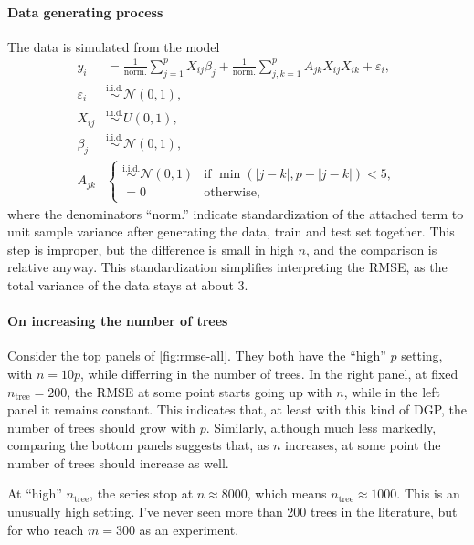 \documentclass{article}
\begin{document}
    \paragraph{Data generating process}

    The data is simulated from the model
    \begin{align}
        y_i &= \frac 1{\text{norm.}} \sum_{j=1}^p X_{ij} \beta_j + \frac 1{\text{norm.}} \sum_{j,k=1}^p A_{jk} X_{ij} X_{ik} + \varepsilon_i, \label{eq:rmsedgp} \\
        \varepsilon_i &\overset{\text{i.i.d.}}{\sim} \mathcal N(0, 1), \\
        X_{ij} &\overset{\text{i.i.d.}}{\sim} U(0, 1), \\
        \beta_j &\overset{\text{i.i.d.}}{\sim} \mathcal N(0, 1), \\
        A_{jk} &\begin{cases}
            \overset{\text{i.i.d.}}{\sim} \mathcal N(0, 1) & \text{if $\min(|j - k|, p - |j - k|) < 5$}, \\
            =0 & \text{otherwise},
        \end{cases}
    \end{align}
    where the denominators ``norm.'' indicate standardization of the attached term to unit sample variance after generating the data, train and test set together. This step is improper, but the difference is small in high $n$, and the comparison is relative anyway. This standardization simplifies interpreting the RMSE, as the total variance of the data stays at about 3.

    \paragraph{On increasing the number of trees}

    Consider the top panels of \autoref{fig:rmse-all}. They both have the ``high'' $p$ setting, with $n = 10p$, while differring in the number of trees. In the right panel, at fixed $n_\text{tree}=200$, the RMSE at some point starts going up with $n$, while in the left panel it remains constant. This indicates that, at least with this kind of DGP, the number of trees should grow with $p$. Similarly, although much less markedly, comparing the bottom panels suggests that, as $n$ increases, at some point the number of trees should increase as well.

    At ``high'' $n_\text{tree}$, the series stop at $n\approx 8000$, which means $n_\text{tree}\approx 1000$. This is an unusually high setting. I've never seen more than 200 trees in the literature, but for \textcite[fig.~6, p.~286]{chipman2010} who reach $m=300$ as an experiment.
\end{document}
